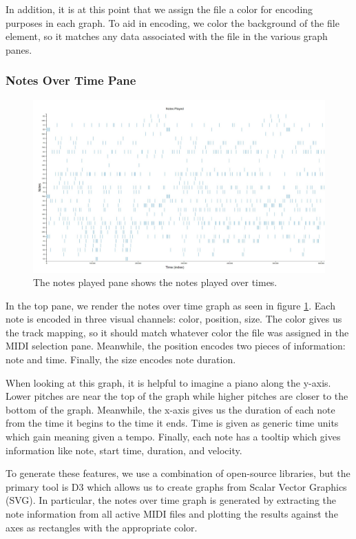 \documentclass[journal]{vgtc}                %
\begin{document}
In addition, it is at this point that we assign the file a color for encoding
purposes in each graph. To aid in encoding, we color the background of the
file element, so it matches any data associated with the file in the various
graph panes.

\subsubsection{Notes Over Time Pane}

\begin{figure}[h]
  \centering
  \includegraphics[width=\columnwidth]{notes-played-single-track}
  \caption{The notes played pane shows the notes played over times.}
  \label{fig:notes-played}
\end{figure}

In the top pane, we render the notes over time graph as seen in figure
\ref{fig:notes-played}. Each note is encoded in three visual channels: color,
position, size. The color gives us the track mapping, so it should match
whatever color the file was assigned in the MIDI selection pane. Meanwhile, the
position encodes two pieces of information: note and time. Finally, the size
encodes note duration.

When looking at this graph, it is helpful to imagine a piano along the y-axis.
Lower pitches are near the top of the graph while higher pitches are closer to the
bottom of the graph. Meanwhile, the x-axis gives us the duration of each note
from the time it begins to the time it ends. Time is given as generic time units
which gain meaning given a tempo. Finally, each note has a tooltip which gives
information like note, start time, duration, and velocity.

To generate these features, we use a combination of open-source libraries, but
the primary tool is D3 which allows us to create graphs from Scalar Vector
Graphics (SVG). In particular, the notes over time graph is generated by
extracting the note information from all active MIDI files and plotting the
results against the axes as rectangles with the appropriate color.
\end{document}
